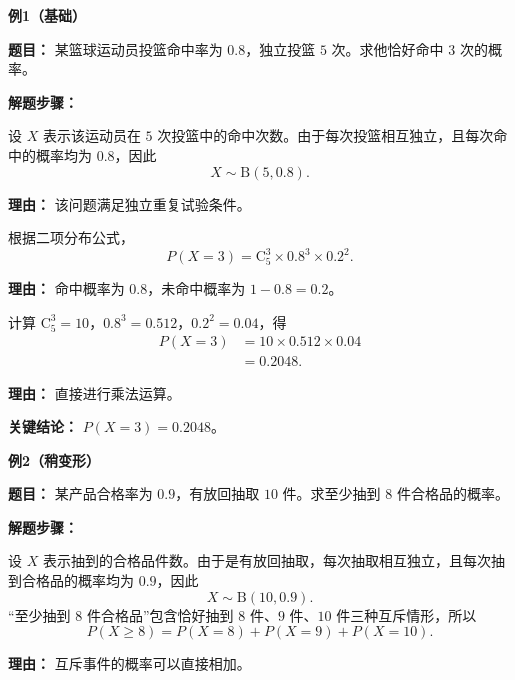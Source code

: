 \begin{examplebox}
	\textbf{\textcolor{CExample}{例1（基础）}}

	\textbf{\textcolor{CExample}{题目：}} 某篮球运动员投篮命中率为 $0.8$，独立投篮 $5$ 次。求他恰好命中 $3$ 次的概率。

	\textbf{\textcolor{CExample}{解题步骤：}}
	\begin{description}[style=nextline, leftmargin=2.8em, labelsep=0.5em, itemsep=0.45em]
		\item[\textbf{第一步（建立模型）：}] 设 $X$ 表示该运动员在 $5$ 次投篮中的命中次数。由于每次投篮相互独立，且每次命中的概率均为 $0.8$，因此
		      \[
			      X\sim \mathrm{B}(5,0.8).
		      \]
		      \par\textbf{理由：} 该问题满足独立重复试验条件。

		\item[\textbf{第二步（代入公式）：}] 根据二项分布公式，
		      \[
			      P(X=3)=\mathrm{C}_5^3 \times 0.8^3 \times 0.2^2.
		      \]
		      \par\textbf{理由：} 命中概率为 $0.8$，未命中概率为 $1-0.8=0.2$。

		\item[\textbf{第三步（数值计算）：}] 计算 $\mathrm{C}_5^3=10$，$0.8^3=0.512$，$0.2^2=0.04$，得
		      \[
			      \begin{aligned}
				      P(X=3)
				       & =10\times 0.512\times 0.04 \\
				       & =0.2048.
			      \end{aligned}
		      \]
		      \par\textbf{理由：} 直接进行乘法运算。
	\end{description}

	\textbf{\textcolor{CExample}{关键结论：}} \textbf{$P(X=3)=0.2048$}。

	\medskip
	\textbf{\textcolor{CExample}{例2（稍变形）}}

	\textbf{\textcolor{CExample}{题目：}} 某产品合格率为 $0.9$，有放回抽取 $10$ 件。求至少抽到 $8$ 件合格品的概率。

	\textbf{\textcolor{CExample}{解题步骤：}}
	\begin{description}[style=nextline, leftmargin=2.8em, labelsep=0.5em, itemsep=0.45em]
		\item[\textbf{第一步（建立模型并分解事件）：}] 设 $X$ 表示抽到的合格品件数。由于是有放回抽取，每次抽取相互独立，且每次抽到合格品的概率均为 $0.9$，因此
		      \[
			      X\sim \mathrm{B}(10,0.9).
		      \]
		      “至少抽到 $8$ 件合格品”包含恰好抽到 $8$ 件、$9$ 件、$10$ 件三种互斥情形，所以
		      \[
			      P(X\geq 8)=P(X=8)+P(X=9)+P(X=10).
		      \]
		      \par\textbf{理由：} 互斥事件的概率可以直接相加。


\end{description}
\end{examplebox}
